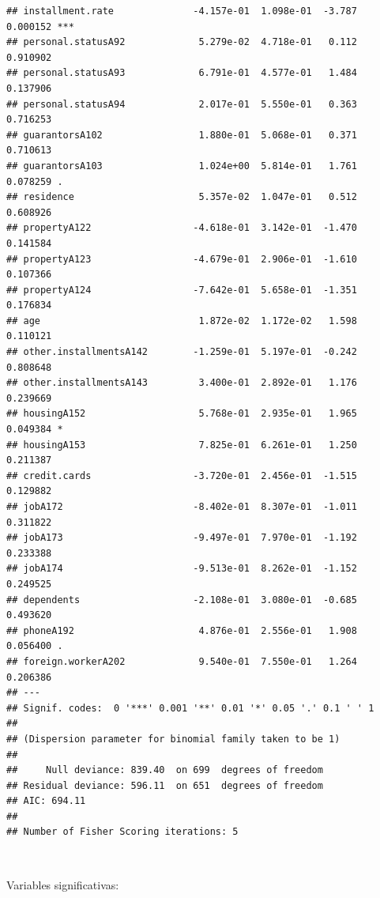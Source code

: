 \documentclass[]{book}
\newenvironment{Shaded}{\begin{snugshade}}{\end{snugshade}}
\newcommand{\KeywordTok}[1]{\textcolor[rgb]{0.13,0.29,0.53}{\textbf{#1}}}
\newcommand{\DecValTok}[1]{\textcolor[rgb]{0.00,0.00,0.81}{#1}}
\newcommand{\FloatTok}[1]{\textcolor[rgb]{0.00,0.00,0.81}{#1}}
\newcommand{\StringTok}[1]{\textcolor[rgb]{0.31,0.60,0.02}{#1}}
\newcommand{\OtherTok}[1]{\textcolor[rgb]{0.56,0.35,0.01}{#1}}
\newcommand{\OperatorTok}[1]{\textcolor[rgb]{0.81,0.36,0.00}{\textbf{#1}}}
\newcommand{\NormalTok}[1]{#1}
\begin{document}
\begin{verbatim}
## installment.rate              -4.157e-01  1.098e-01  -3.787 0.000152 ***
## personal.statusA92             5.279e-02  4.718e-01   0.112 0.910902    
## personal.statusA93             6.791e-01  4.577e-01   1.484 0.137906    
## personal.statusA94             2.017e-01  5.550e-01   0.363 0.716253    
## guarantorsA102                 1.880e-01  5.068e-01   0.371 0.710613    
## guarantorsA103                 1.024e+00  5.814e-01   1.761 0.078259 .  
## residence                      5.357e-02  1.047e-01   0.512 0.608926    
## propertyA122                  -4.618e-01  3.142e-01  -1.470 0.141584    
## propertyA123                  -4.679e-01  2.906e-01  -1.610 0.107366    
## propertyA124                  -7.642e-01  5.658e-01  -1.351 0.176834    
## age                            1.872e-02  1.172e-02   1.598 0.110121    
## other.installmentsA142        -1.259e-01  5.197e-01  -0.242 0.808648    
## other.installmentsA143         3.400e-01  2.892e-01   1.176 0.239669    
## housingA152                    5.768e-01  2.935e-01   1.965 0.049384 *  
## housingA153                    7.825e-01  6.261e-01   1.250 0.211387    
## credit.cards                  -3.720e-01  2.456e-01  -1.515 0.129882    
## jobA172                       -8.402e-01  8.307e-01  -1.011 0.311822    
## jobA173                       -9.497e-01  7.970e-01  -1.192 0.233388    
## jobA174                       -9.513e-01  8.262e-01  -1.152 0.249525    
## dependents                    -2.108e-01  3.080e-01  -0.685 0.493620    
## phoneA192                      4.876e-01  2.556e-01   1.908 0.056400 .  
## foreign.workerA202             9.540e-01  7.550e-01   1.264 0.206386    
## ---
## Signif. codes:  0 '***' 0.001 '**' 0.01 '*' 0.05 '.' 0.1 ' ' 1
## 
## (Dispersion parameter for binomial family taken to be 1)
## 
##     Null deviance: 839.40  on 699  degrees of freedom
## Residual deviance: 596.11  on 651  degrees of freedom
## AIC: 694.11
## 
## Number of Fisher Scoring iterations: 5
\end{verbatim}

~

Variables significativas:

\begin{Shaded}
\end{Shaded}
\end{document}
